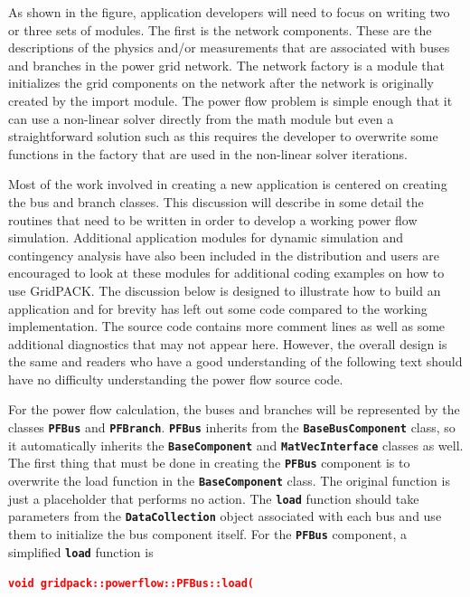 \documentclass[12pt]{report} %
\begin{document}
As shown in the figure, application developers will need to focus on writing two or three sets of modules. The first is the network components. These are the descriptions of the physics and/or measurements that are associated with buses and branches in the power grid network. The network factory is a module that initializes the grid components on the network after the network is originally created by the import module. The power flow problem is simple enough that it can use a non-linear solver directly from the math module but even a straightforward solution such as this requires the developer to overwrite some functions in the factory that are used in the non-linear solver iterations.

Most of the work involved in creating a new application is centered on creating the bus and branch classes. This discussion will describe in some detail the routines that need to be written in order to develop a working power flow simulation. Additional application modules for dynamic simulation and contingency analysis have also been included in the distribution and users are encouraged to look at these modules for additional coding examples on how to use GridPACK. The discussion below is designed to illustrate how to build an application and for brevity has left out some code compared to the working implementation. The source code contains more comment lines as well as some additional diagnostics that may not appear here. However, the overall design is the same and readers who have a good understanding of the following text should have no difficulty understanding the power flow source code.

For the power flow calculation, the buses and branches will be represented by the classes \texttt{\textbf{PFBus}} and \texttt{\textbf{PFBranch}}. \texttt{\textbf{PFBus}} inherits from the \texttt{\textbf{BaseBusComponent}} class, so it automatically inherits the \texttt{\textbf{BaseComponent}} and \texttt{\textbf{MatVecInterface}} classes as well. The first thing that must be done in creating the \texttt{\textbf{PFBus}} component is to overwrite the load function in the \texttt{\textbf{BaseComponent}} class. The original function is just a placeholder that performs no action. The \texttt{\textbf{load}} function should take parameters from the \texttt{\textbf{DataCollection}} object associated with each bus and use them to initialize the bus component itself. For the \texttt{\textbf{PFBus}} component, a simplified \texttt{\textbf{load}} function is

\textcolor{red}{\texttt{\textbf{void gridpack::powerflow::PFBus::load(}}}
\end{document}
